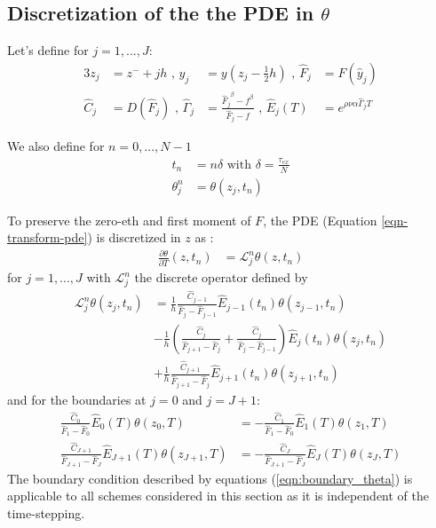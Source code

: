 \documentclass[]{rAMF2e}
\begin{document}
\subsection{Discretization of the the PDE in $\theta$}
Let's define for $j=1,...,J$:
\begin{alignat}{3}
z_j &= z^{-} + jh \text{ , } \hat{y}_j&=y(z_j - \frac{1}{2}h) \text{ , } \hat{F}_j&=F(\hat{y}_j)\\
\hat{C}_j&=D(\hat{F}_j) \text{ , } \hat{\Gamma}_j &= \frac{{\hat{F}_j}^{\beta}-f^{\beta}}{\hat{F}_j-f} \text{ , } \hat{E}_j(T)&=e^{\rho\nu\alpha\hat{\Gamma}_j T}
\end{alignat}

We also define for $n=0,...,N-1$
\begin{align}
t_n &= n \delta \text{ with } \delta = \frac{\tau_{ex}}{N} \\
\theta_j^n &= \theta(z_j,t_n)
\end{align}

To preserve the zero-eth and first moment of $F$, the PDE (Equation \ref{eqn-transform-pde}) is discretized in $z$ as \citep{hagan2013change}:
\begin{align}
\frac{\partial \theta}{\partial T}(z, t_n) &= \mathcal{L}_{j}^n \theta(z, t_n)
\end{align}
for $j=1,...,J$ with $\mathcal{L}_{j}^n$ the discrete operator defined by
\begin{align}
  \mathcal{L}_{j}^n\theta(z_j, t_n) &= \frac{1}{h} \frac{\hat{C}_{j-1}}{\hat{F}_{j}-\hat{F}_{j-1}}\hat{E}_{j-1}(t_n)\theta(z_{j-1},t_n)\\
  &-\frac{1}{h}\left(\frac{\hat{C}_{j}}{\hat{F}_{j+1}-\hat{F}_j}+\frac{\hat{C}_{j}}{\hat{F}_{j}-\hat{F}_{j-1}}\right)\hat{E}_{j}(t_n)\theta(z_j,t_n)\\
  &+\frac{1}{h}\frac{\hat{C}_{j+1}}{\hat{F}_{j+1}-\hat{F}_j}\hat{E}_{j+1}(t_n)\theta(z_{j+1},t_n)
\end{align}
and for the boundaries at $j=0$ and $j=J+1$:
\begin{subequations}\label{eqn:boundary_theta}
\begin{align}
\frac{\hat{C}_0}{\hat{F}_1-\hat{F}_0}\hat{E}_0(T) \theta(z_0,T) &= - \frac{\hat{C}_1}{\hat{F}_1-\hat{F}_0}\hat{E}_1(T) \theta(z_1,T) \\
\frac{\hat{C}_{J+1}}{\hat{F}_{J+1}-\hat{F}_J}\hat{E}_{J+1}(T) \theta(z_{J+1},T) &= - \frac{\hat{C}_J}{\hat{F}_{J+1}-\hat{F}_{J}}\hat{E}_J(T) \theta(z_J,T)
\end{align}
\end{subequations}
The boundary condition described by equations (\ref{eqn:boundary_theta}) is applicable to all schemes considered in this section as it is independent of the time-stepping.
\end{document}
